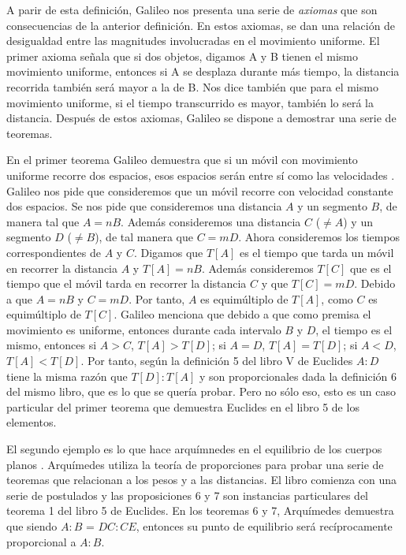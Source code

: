 A parir de esta definición, Galileo nos presenta una serie de \textit{axiomas} que son consecuencias de la anterior definición. En estos axiomas, se dan una relación de desigualdad entre las magnitudes involucradas en el movimiento uniforme. El primer axioma señala que si dos objetos, digamos A y B tienen el mismo movimiento uniforme, entonces si A se desplaza durante más tiempo, la distancia recorrida también será mayor a la de B. Nos dice también que para el mismo movimiento uniforme, si el tiempo transcurrido es mayor, también lo será la distancia. Después de estos axiomas, Galileo se dispone a demostrar una serie de teoremas.

En el primer teorema Galileo demuestra que si un móvil con movimiento uniforme recorre dos espacios, esos espacios serán entre sí como las velocidades \cite[p. 215]{galtre}. Galileo nos pide que consideremos que un móvil recorre con velocidad constante dos espacios. Se nos pide que consideremos una distancia $A$ y un segmento $B$, de manera tal que $A = nB$. Además consideremos una distancia $C$ ($\neq A$) y un segmento $D$ ($\neq B$), de tal manera que $C = mD$. Ahora consideremos los tiempos correspondientes de $A$ y $C$. Digamos que $T[A]$ es el tiempo que tarda un móvil en recorrer la distancia $A$ y $T[A] = nB$. Además consideremos $T[C]$ que es el tiempo que el móvil tarda en recorrer la distancia $C$ y que $T[C] = mD$. Debido a que  $A = nB$ y $C = mD$. Por tanto, $A$ es equimúltiplo de $T[A]$, como $C$ es equimúltiplo de $T[C]$. Galileo menciona que debido a que como premisa el movimiento es uniforme, entonces durante cada intervalo $B$ y $D$, el tiempo es el mismo, entonces si $A > C$, $T[A] > T[D]$; si $A = D$, $T[A] = T[D]$; si $A < D$, $T[A] < T[D]$. Por tanto, según la definición 5 del libro V de Euclides \cite{Euclid2008} $A:D$ tiene la misma razón que $T[D]:T[A]$ y son proporcionales dada la definición 6 del mismo libro, que es lo que se quería probar. Pero no sólo eso, esto es un caso particular del primer teorema que demuestra Euclides en el libro 5 de los elementos.

El segundo ejemplo es lo que hace arquímnedes en el equilibrio de los cuerpos planos \cite{Archimedes1897}. Arquímedes utiliza la teoría de proporciones para probar una serie de teoremas que relacionan a los pesos y a las distancias. El libro comienza con una serie de postulados y las proposiciones 6 y 7 son instancias particulares del teorema 1 del libro 5 de Euclides. En los teoremas 6 y 7, Arquímedes demuestra que siendo $A:B$ = $DC:CE$, entonces su punto de equilibrio será recíprocamente proporcional a $A:B$.

